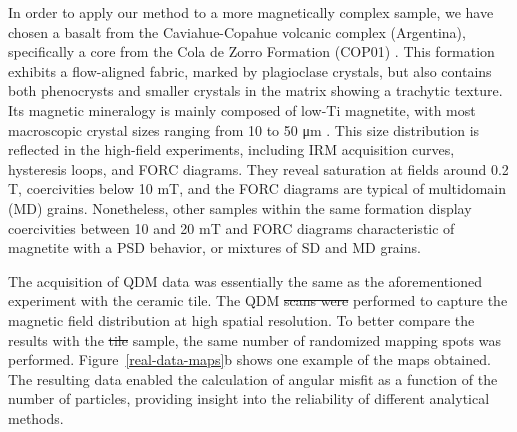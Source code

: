 \documentclass[onecolumn,12pt,a4paper]{article}
\providecommand{\DIFaddtex}[1]{{\protect\color{blue}\uwave{#1}}} %
\providecommand{\DIFdeltex}[1]{{\protect\color{red}\sout{#1}}}                      %
\providecommand{\DIFaddbegin}{} %
\providecommand{\DIFaddend}{} %
\providecommand{\DIFdelbegin}{} %
\providecommand{\DIFdelend}{} %
\providecommand{\DIFadd}[1]{\texorpdfstring{\DIFaddtex{#1}}{#1}} %
\providecommand{\DIFdel}[1]{\texorpdfstring{\DIFdeltex{#1}}{}} %
\newcommand{\DIFscaledelfig}{0.5}
\newlength{\DIFdelgraphicswidth} %
\newlength{\DIFdelgraphicsheight} %
\newcommand{\DIFaddincludegraphics}[2][]{{\color{blue}\fbox{\DIFOincludegraphics[#1]{#2}}}} %
\newcommand{\DIFdelincludegraphics}[2][]{%
\sbox{\DIFdelgraphicsbox}{\DIFOincludegraphics[#1]{#2}}%
\settoboxwidth{\DIFdelgraphicswidth}{\DIFdelgraphicsbox} %
\settoboxtotalheight{\DIFdelgraphicsheight}{\DIFdelgraphicsbox} %
\scalebox{\DIFscaledelfig}{%
\parbox[b]{\DIFdelgraphicswidth}{\usebox{\DIFdelgraphicsbox}\\[-\baselineskip] \rule{\DIFdelgraphicswidth}{0em}}\llap{\resizebox{\DIFdelgraphicswidth}{\DIFdelgraphicsheight}{%
\setlength{\unitlength}{\DIFdelgraphicswidth}%
\begin{picture}(1,1)%
\thicklines\linethickness{2pt} %
{\color[rgb]{1,0,0}\put(0,0){\framebox(1,1){}}}%
{\color[rgb]{1,0,0}\put(0,0){\line( 1,1){1}}}%
{\color[rgb]{1,0,0}\put(0,1){\line(1,-1){1}}}%
\end{picture}%
}\hspace*{3pt}}} %
} %
\DeclareRobustCommand{\DIFaddbegin}{\DIFOaddbegin \let\includegraphics\DIFaddincludegraphics} %
\DeclareRobustCommand{\DIFaddend}{\DIFOaddend \let\includegraphics\DIFOincludegraphics} %
\DeclareRobustCommand{\DIFdelbegin}{\DIFOdelbegin \let\includegraphics\DIFdelincludegraphics} %
\DeclareRobustCommand{\DIFdelend}{\DIFOaddend \let\includegraphics\DIFOincludegraphics} %
\begin{document}
In order to apply our method to a more magnetically complex sample, we have chosen a basalt from the Caviahue-Copahue volcanic complex (Argentina), specifically a core from the Cola de Zorro Formation (COP01) \citep{Moncinhatto2019}. This formation exhibits a flow-aligned fabric, marked by plagioclase crystals, but also contains both phenocrysts and smaller crystals in the matrix showing a trachytic texture. Its magnetic mineralogy is mainly composed of low-Ti magnetite, with most macroscopic crystal sizes ranging from 10 to 50 \si{\micro\meter} \citep{Moncinhatto2019}. This size distribution is reflected in the high-field experiments, including IRM acquisition curves, hysteresis loops, and FORC diagrams. They reveal saturation at fields around 0.2 \si{T}, coercivities below 10 \si{mT}, and the FORC diagrams are typical of multidomain (MD) grains. Nonetheless, other samples within the same formation display coercivities between 10 and 20 \si{mT} and FORC diagrams characteristic of magnetite with a PSD behavior, or mixtures of SD and MD grains.

The acquisition of QDM data was essentially the same as the aforementioned experiment with the ceramic tile. The QDM \DIFdelbegin \DIFdel{scans were }\DIFdelend \DIFaddbegin \DIFadd{imaging was }\DIFaddend performed to capture the magnetic field distribution at high spatial resolution. To better compare the results with the \DIFdelbegin \DIFdel{tile }\DIFdelend \DIFaddbegin \DIFadd{ceramic }\DIFaddend sample, the same number of randomized mapping spots was performed. Figure~\ref{real-data-maps}b shows one example of the maps obtained. The resulting data enabled the calculation of angular misfit as a function of the number of particles, providing insight into the reliability of different analytical methods.
\end{document}
